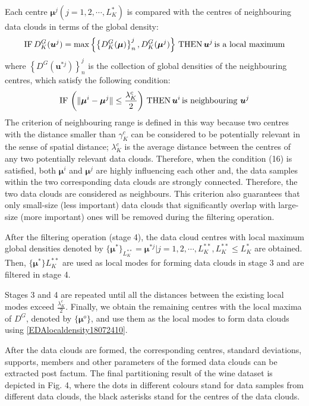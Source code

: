 Each centre $\bm\mu^j( j = 1, 2, \cdots, L_K^*)$ is compared with the centres of neighbouring data clouds in terms of the global density:
\begin{align}\label{EDAlocaldensity18072416}
\textup{IF}\,  D^G_K(\bm u^{j})=\max \left\{ \left\{D^G_K(\bm \mu)\right\}_n^j,D^G_K(\bm \mu^j)\right\}\, \textup{THEN}\, \bm u^{j}\,\textup{is a local maximum}
\end{align}
where $\left\{ D^G(\bm u^{*j}) \right\}_n^j$ is the collection of global densities of the neighbouring centres, which satisfy the following condition:
\begin{align}\label{EDAlocaldensity18072417}
\textup{IF}\,  \left(\|\bm \mu^i-\bm \mu^j\|\leq \frac{\lambda_K^c}{2}\right)\, \textup{THEN}\, \bm u^{i}\,\textup{is neighbouring }\bm u^{j}
\end{align}
The criterion of neighbouring range is defined in this way because two centres with the distance smaller than $\gamma_K^c$ can be considered to be potentially relevant in the sense of spatial distance; $\lambda_K^c$ is the average distance between the centres of any two potentially relevant data clouds. Therefore, when the condition (16) is satisfied, both $\bm \mu^i$ and $\bm \mu^j$ are highly influencing each other and, the data samples within the two corresponding data clouds are strongly connected. Therefore, the two data clouds are considered as neighbours. This criterion also guarantees that only small-size (less important) data clouds that
significantly overlap with large-size (more important) ones will be removed during the filtering operation.

After the filtering operation (stage 4), the data cloud centres with local maximum global densities denoted by
$\{\bm \mu^{*}\}_{L_K^{**}}={\bm \mu^{*j}| j = 1, 2, \cdots, L_K^{**} , L_K^{**} \leq L_K^{*}}$ are obtained. Then, $\{\bm \mu^*\}L_K^{**}$ are used as local modes for forming data clouds in stage 3 and are filtered in stage 4.

Stages 3 and 4 are repeated until all the distances between the existing local modes exceed $\frac{\lambda_K^c} 2$. Finally, we obtain the remaining centres with the local maxima of $D^G$, denoted by $\{\bm\mu^o\}$, and use them as the local modes to form data clouds
using \eqref{EDAlocaldensity18072410}.

After the data clouds are formed, the corresponding centres, standard deviations, supports, members and other parameters of the formed data clouds can be extracted post factum. The final partitioning result of the wine dataset \cite{AeberhardWinedata1992} is depicted in Fig. 4, where the dots in different colours stand for data samples from different data clouds, the black asterisks stand for
the centres of the data clouds.

